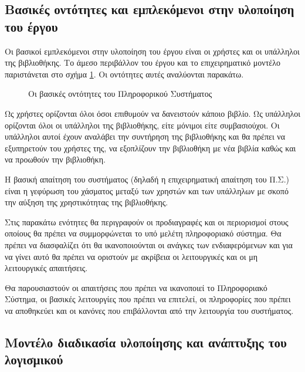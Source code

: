 \documentclass{assignment}
\begin{document}
\subsection{Βασικές οντότητες και εμπλεκόμενοι στην υλοποίηση του έργου}

Οι βασικοί εμπλεκόμενοι στην υλοποίηση του έργου είναι οι χρήστες και οι υπάλληλοι της βιβλιοθήκης. Το άμεσο περιβάλλον του έργου και το επιχειρηματικό μοντέλο παριστάνεται στο σχήμα \ref{fig:entities}. Οι οντότητες αυτές αναλύονται παρακάτω. 

\begin{figure}
\begin{center}
\caption{Οι βασικές οντότητες του Πληροφορικού Συστήματος}
\label{fig:entities}
\end{center}
\end{figure}

Ως χρήστες ορίζονται όλοι όσοι επιθυμούν να δανειστούν κάποιο βιβλίο. Ως υπάλληλοι ορίζονται όλοι οι υπάλληλοι της βιβλιοθήκης, είτε μόνιμοι είτε συμβασιούχοι. Οι υπάλληλοι αυτοί έχουν αναλάβει την συντήρηση της βιβλιοθήκης και θα πρέπει να εξυπηρετούν του χρήστες της, να εξοπλίζουν την βιβλιοθήκη με νέα βιβλία καθώς και να προωθούν την βιβλιοθήκη.

Η βασική απαίτηση του συστήματος (δηλαδή η επιχειρηματική απαίτηση του Π.Σ.) είναι η γεφύρωση του χάσματος μεταξύ των χρηστών και των υπάλληλων με σκοπό την αύξηση της χρηστικότητας της βιβλιοθήκης.

Στις παρακάτω ενότητες θα περιγραφούν οι προδιαγραφές και οι περιορισμοί στους οποίους θα πρέπει να συμμορφώνεται το υπό μελέτη πληροφοριακό σύστημα. Θα πρέπει να διασφαλίζει ότι θα ικανοποιούνται οι ανάγκες των ενδιαφερόμενων και για να γίνει αυτό θα πρέπει να οριστούν με ακρίβεια οι λειτουργικές και οι μη λειτουργικές απαιτήσεις.

Θα παρουσιαστούν οι απαιτήσεις που πρέπει να ικανοποιεί το Πληροφοριακό Σύστημα, οι βασικές λειτουργίες που πρέπει να επιτελεί, οι πληροφορίες που πρέπει να αποθηκεύει και οι κανόνες που επιβάλλονται από την λειτουργία του συστήματος.

\subsection{Μοντέλο διαδικασία υλοποίησης και ανάπτυξης του λογισμικού}
\end{document}
